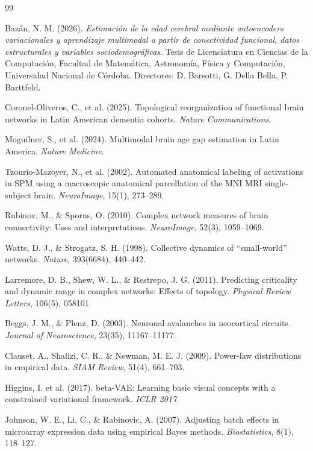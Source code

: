 \documentclass[12pt,a4paper]{article}
\begin{document}
\newpage
\begin{thebibliography}{99}

Bazán, N. M. (2026). \textit{Estimación de la edad cerebral mediante autoencoders
variacionales y aprendizaje multimodal a partir de conectividad funcional, datos
estructurales y variables sociodemográficas}. Tesis de Licenciatura en Ciencias de
la Computación, Facultad de Matemática, Astronomía, Física y Computación,
Universidad Nacional de Córdoba. Directores: D. Barsotti, G. Della Bella, P. Barttfeld.

Coronel-Oliveros, C., et al. (2025). Topological reorganization of functional brain networks
in Latin American dementia cohorts. \textit{Nature Communications}.

Moguilner, S., et al. (2024). Multimodal brain age gap estimation in Latin America.
\textit{Nature Medicine}.

Tzourio-Mazoyer, N., et al. (2002). Automated anatomical labeling of activations in SPM
using a macroscopic anatomical parcellation of the MNI MRI single-subject brain.
\textit{NeuroImage}, 15(1), 273--289.

Rubinov, M., \& Sporns, O. (2010). Complex network measures of brain connectivity: Uses and
interpretations. \textit{NeuroImage}, 52(3), 1059--1069.

Watts, D. J., \& Strogatz, S. H. (1998). Collective dynamics of ``small-world'' networks.
\textit{Nature}, 393(6684), 440--442.

Larremore, D. B., Shew, W. L., \& Restrepo, J. G. (2011). Predicting criticality and dynamic
range in complex networks: Effects of topology. \textit{Physical Review Letters}, 106(5), 058101.

Beggs, J. M., \& Plenz, D. (2003). Neuronal avalanches in neocortical circuits.
\textit{Journal of Neuroscience}, 23(35), 11167--11177.

Clauset, A., Shalizi, C. R., \& Newman, M. E. J. (2009). Power-law distributions in empirical
data. \textit{SIAM Review}, 51(4), 661--703.

Higgins, I. et al. (2017). beta-VAE: Learning basic visual concepts with a constrained
variational framework. \textit{ICLR 2017}.

Johnson, W. E., Li, C., \& Rabinovic, A. (2007). Adjusting batch effects in microarray
expression data using empirical Bayes methods. \textit{Biostatistics}, 8(1), 118--127.

\end{thebibliography}
\end{document}
